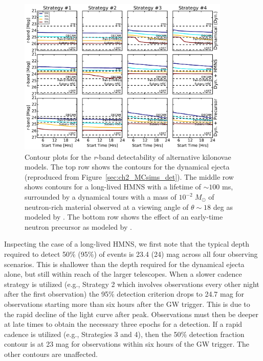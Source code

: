 \begin{figure}[t!]
\centering
\includegraphics[width=0.9\textwidth]{./figs/chapter2/ch2_f19.pdf}
\caption{Contour plots for the {\em r}-band detectability of alternative kilonovae models. The top row shows the contours for the dynamical ejecta (reproduced from Figure~\ref{sec:ch2_MCsims_det}). The middle row shows contours for a long-lived HMNS with a lifetime of $\sim 100$ ms, surrounded by a dynamical tours with a mass of $10^{-2}\;M_{\odot}$  of neutron-rich material observed at a viewing angle of $\theta \sim 18$ deg as modeled by \citet{Kasen+15}. The bottom row shows the effect of an early-time neutron precursor as modeled by \citet{Metzger+15}.}
\label{fig:ch2_altdet}
\end{figure}

Inspecting the case of a long-lived HMNS, we first note that the typical depth required to detect 50\% (95\%) of events is 23.4 (24) mag across all four observing scenarios. This is shallower than the depth required for the dynamical ejecta alone, but still within reach of the larger telescopes. When a slower cadence strategy is utilized (e.g., Strategy 2 which involves observations every other night after the first observation) the 95\% detection criterion drops to 24.7 mag for observations starting more than six hours after the GW trigger. This is due to the rapid decline of the light curve after peak. Observations must then be deeper at late times to obtain the necessary three epochs for a detection. If a rapid cadence is utilized (e.g., Strategies 3 and 4), then the 50\% detection fraction contour is at 23 mag for observations within six hours of the GW trigger. The other contours are unaffected.

